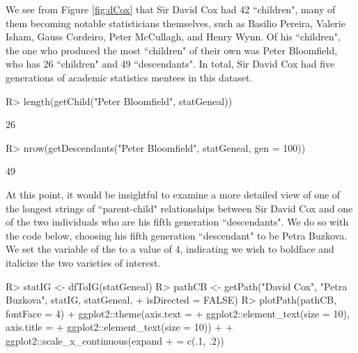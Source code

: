\documentclass[article,shortnames]{jss}
\begin{document}
We see from Figure \ref{fig:dCox} that Sir David Cox had 42 ``children", many of them becoming notable statisticians themselves, such as Basilio Pereira, Valerie Isham, Gauss Cordeiro, Peter McCullagh, and Henry Wynn. Of his ``children", the one who produced the most ``children" of their own was Peter Bloomfield, who has 26 ``children" and 49 ``descendants". In total, Sir David Cox had five generations of academic statistics mentees in this dataset.

\begin{CodeChunk}
\begin{CodeInput}
R> length(getChild("Peter Bloomfield", statGeneal))
\end{CodeInput}
\begin{CodeOutput}
[1] 26
\end{CodeOutput}
\begin{CodeInput}
R> nrow(getDescendants("Peter Bloomfield", statGeneal, gen = 100))
\end{CodeInput}
\begin{CodeOutput}
[1] 49
\end{CodeOutput}
\end{CodeChunk}

At this point, it would be insightful to examine a more detailed view of one of the longest strings of ``parent-child" relationships between Sir David Cox and one of the two individuals who are his fifth generation ``descendants". We do so with the code below, choosing his fifth generation ``descendant" to be Petra Buzkova. We set the  variable of the  to a value of 4, indicating we wish to boldface and italicize the two varieties of interest.

\begin{CodeChunk}
\begin{CodeInput}
R> statIG <- dfToIG(statGeneal)
R> pathCB <- getPath("David Cox", "Petra Buzkova", statIG, statGeneal,
+    isDirected = FALSE)
R> plotPath(pathCB, fontFace = 4) + ggplot2::theme(axis.text =
+    ggplot2::element_text(size = 10), axis.title =
+    ggplot2::element_text(size = 10)) + + ggplot2::scale_x_continuous(expand
+    = c(.1, .2))
\end{CodeInput}
\end{CodeChunk}
\end{document}
